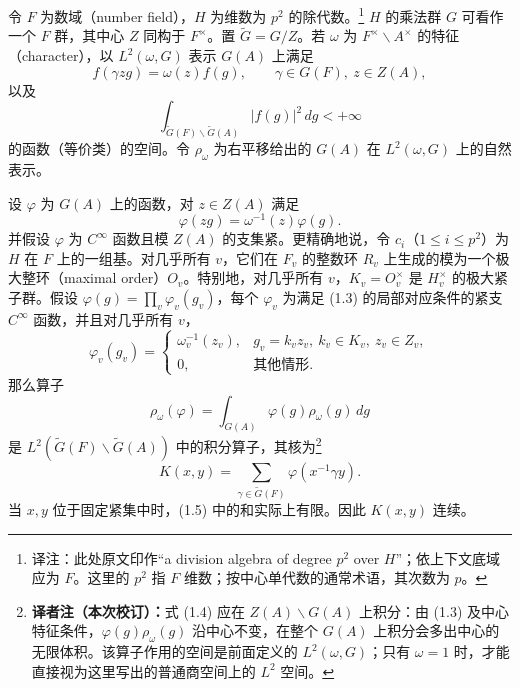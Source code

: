 令 $F$ 为数域（number field），$H$ 为维数为 $p^2$ 的除代数。\footnote{译注：此处原文印作“a division algebra of degree $p^2$ over $H$”；依上下文底域应为 $F$。这里的 $p^2$ 指 $F$ 维数；按中心单代数的通常术语，其次数为 $p$。} $H$ 的乘法群 $G$ 可看作一个 $F$ 群，其中心 $Z$ 同构于 $F^\times$。置 $\widetilde G=G/Z$。若 $\omega$ 为 $F^\times\backslash A^\times$ 的特征（character），以 $L^2(\omega,G)$ 表示 $G(A)$ 上满足
\begin{equation}
 f(\gamma zg)=\omega(z)f(g),\qquad\gamma\in G(F),\ z\in Z(A),\tag{1.1}
\end{equation}
以及
\begin{equation}
 \int_{\widetilde G(F)\backslash\widetilde G(A)}|f(g)|^2\,dg<+\infty\tag{1.2}
\end{equation}
的函数（等价类）的空间。令 $\rho_\omega$ 为右平移给出的 $G(A)$ 在 $L^2(\omega,G)$ 上的自然表示。

设 $\varphi$ 为 $G(A)$ 上的函数，对 $z\in Z(A)$ 满足
\begin{equation}
 \varphi(zg)=\omega^{-1}(z)\varphi(g).\tag{1.3}
\end{equation}
并假设 $\varphi$ 为 $C^\infty$ 函数且模 $Z(A)$ 的支集紧。更精确地说，令
$c_i$（$1\le i\le p^2$）为 $H$ 在 $F$ 上的一组基。对几乎所有 $v$，它们在 $F_v$ 的整数环 $R_v$ 上生成的模为一个极大整环（maximal order）$O_v$。特别地，对几乎所有 $v$，$K_v=O_v^\times$ 是 $H_v^\times$ 的极大紧子群。假设
$\varphi(g)=\prod_v\varphi_v(g_v)$，每个 $\varphi_v$ 为满足 (1.3) 的局部对应条件的紧支 $C^\infty$ 函数，并且对几乎所有 $v$，
\[
 \varphi_v(g_v)=\begin{cases}
 \omega_v^{-1}(z_v),&g_v=k_vz_v,\ k_v\in K_v,\ z_v\in Z_v,\\
 0,&\text{其他情形}.
 \end{cases}
\]
那么算子
\begin{equation}
 \rho_\omega(\varphi)=\int_{G(A)}\varphi(g)\rho_\omega(g)\,dg\tag{1.4}
\end{equation}
是 $L^2(\widetilde G(F)\backslash\widetilde G(A))$ 中的积分算子，其核为\footnote{\textbf{译者注（本次校订）：}式 (1.4) 应在 $Z(A)\backslash G(A)$ 上积分：由 (1.3) 及中心特征条件，$\varphi(g)\rho_\omega(g)$ 沿中心不变，在整个 $G(A)$ 上积分会多出中心的无限体积。该算子作用的空间是前面定义的 $L^2(\omega,G)$；只有 $\omega=1$ 时，才能直接视为这里写出的普通商空间上的 $L^2$ 空间。}
\begin{equation}
 K(x,y)=\sum_{\gamma\in\widetilde G(F)}\varphi(x^{-1}\gamma y).\tag{1.5}
\end{equation}
当 $x,y$ 位于固定紧集中时，(1.5) 中的和实际上有限。因此 $K(x,y)$ 连续。


